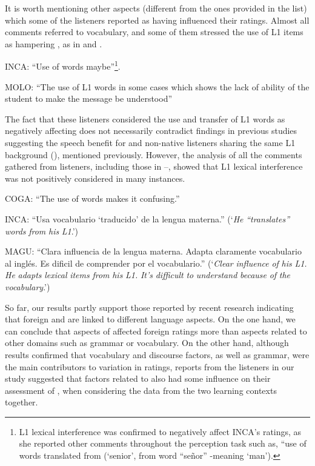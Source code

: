 \documentclass[output=paper]{langsci/langscibook}
\begin{document}
It is worth mentioning other aspects (different from the ones provided in the list) which some of the listeners reported as having influenced their  ratings. Almost all comments referred to vocabulary, and some of them stressed the use of {L1} items as hampering , as in  
 and . 

\largerpage[2]
\ea\label{ex:delrio:2}
INCA: “Use of  words maybe”\footnote{L1 lexical interference was confirmed to negatively affect INCA’s  ratings, as she reported other comments throughout the perception task such as, “use of words translated from  (‘senior’, from  word “señor” -meaning ‘man’).}. \\
\z

\clearpage 
\ea\label{ex:delrio:3}
MOLO: “The use of {L1} words in some cases which shows the lack of ability of the student to make the message be understood”
\z

The fact that these listeners considered the use and transfer of {L1} words as negatively affecting  does not necessarily contradict findings in previous studies suggesting the speech  benefit for  and non-native listeners sharing the same {L1} background (\citealt{Hayes-HarbEtAl2008,GallardodelPuertoEtAl2009}), mentioned previously. However, the analysis of all the comments gathered from listeners, including those in --, showed that {L1} lexical interference was not positively considered in many instances.

\ea\label{ex:delrio:4}
COGA: “The use of  words makes it confusing.”
\z

\ea\label{ex:delrio:5}
INCA: “Usa vocabulario ‘traducido’ de la lengua materna.” (‘\textit{He} \textit{“translates”} \textit{words} \textit{from} \textit{his} \textit{L1}.’) 
\z

\ea\label{ex:delrio:6}
MAGU: “Clara influencia de la lengua materna. Adapta claramente vocabulario al inglés. Es dificil de comprender por el vocabulario.” (‘\textit{Clear} \textit{influence} \textit{of} \textit{his} \textit{L1.} \textit{He} \textit{adapts} \textit{lexical} \textit{items} \textit{from} \textit{his} \textit{L1.} \textit{It’s} \textit{difficult} \textit{to} \textit{understand} \textit{because} \textit{of} \textit{the} \textit{vocabulary}.’)
\z

So far, our results partly support those reported by recent research indicating that foreign  and  are linked to different language aspects. On the one hand, we can conclude that aspects of  affected foreign  ratings more than aspects related to other domains such as grammar or vocabulary. On the other hand, although results confirmed that vocabulary and discourse factors, as well as grammar, were the main contributors to variation in  ratings, reports from the listeners in our study suggested that factors related to  also had some influence on their assessment of , when considering the data from the two learning contexts together. 
\end{document}
